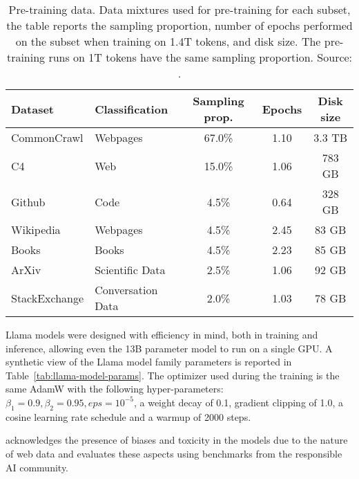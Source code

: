 \begin{table}[h!]
	\centering
	\begin{tabularx}{\textwidth}{Xlccc}
		\hline
		\textbf{Dataset} & \textbf{Classification} & \textbf{Sampling prop.} & \textbf{Epochs} & \textbf{Disk size} \\
		\hline
		CommonCrawl      & Webpages                & 67.0\%                  & 1.10            & 3.3 TB             \\
		C4               & Web                     & 15.0\%                  & 1.06            & 783 GB             \\
		Github           & Code                    & 4.5\%                   & 0.64            & 328 GB             \\
		Wikipedia        & Webpages                & 4.5\%                   & 2.45            & 83 GB              \\
		Books            & Books                   & 4.5\%                   & 2.23            & 85 GB              \\
		ArXiv            & Scientific Data         & 2.5\%                   & 1.06            & 92 GB              \\
		StackExchange    & Conversation Data       & 2.0\%                   & 1.03            & 78 GB              \\
		\hline
	\end{tabularx}
	\caption{Pre-training data. Data mixtures used for pre-training for each subset, the table reports the sampling proportion, number of epochs performed on the subset when training on 1.4T tokens, and disk size. The pre-training runs on 1T tokens have the same sampling proportion. Source: \textcite{touvron2023llama}.}
	\label{tab:llama-pretraining-data}
\end{table}

Llama models were designed with efficiency in mind, both in training and inference, allowing even the 13B parameter model to run on a single GPU\@.
A synthetic view of the Llama model family parameters is reported in Table~\ref{tab:llama-model-params}.
The optimizer used during the training is the same AdamW with the following hyper-parameters: $\beta_1=0.9, \beta_2=0.95, eps=10^{-5}$, a weight decay of 0.1, gradient clipping of 1.0, a cosine learning rate schedule and a warmup of 2000 steps.

\textcite{touvron2023llama} acknowledges the presence of biases and toxicity in the models due to the nature of web data and evaluates these aspects using benchmarks from the responsible AI community.

